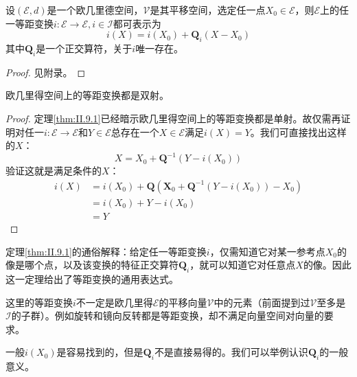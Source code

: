 \documentclass[main.tex]{subfiles}
\begin{document}
\begin{theorem}[等距变换的表示定理]\label{thm:II.9.1}
设$\left(\mathcal{E},d\right)$是一个欧几里德空间，$\mathcal{V}$是其平移空间，选定任一点$X_0\in\mathcal{E}$，则$\mathcal{E}$上的任一等距变换$i:\mathcal{E}\rightarrow\mathcal{E},i\in\mathcal{I}$都可表示为
\[
i\left(X\right)=i\left(X_0\right)+\mathbf{Q}_i\left(X-X_0\right)
\]
其中$\mathbf{Q}_i$是一个正交算符，关于$i$唯一存在。
\end{theorem}
\begin{proof}
见附录。
\end{proof}

\begin{corollary}
欧几里得空间上的等距变换都是双射。
\end{corollary}
\begin{proof}
定理\ref{thm:II.9.1}已经暗示欧几里得空间上的等距变换都是单射。故仅需再证明对任一$i:
\mathcal{E}\rightarrow\mathcal{E}$和$Y\in\mathcal{E}$总存在一个$X\in\mathcal{E}$满足$i\left(X\right)=Y$。我们可直接找出这样的$X$：
\[
X=X_0+\mathbf{Q}^{-1}\left(Y-i\left(X_0\right)\right)
\]
验证这就是满足条件的$X$：
\begin{align*}
i\left(X\right)&=i\left(X_0\right)+\mathbf{Q}\left(\mathbf{X}_0+\mathbf{Q}^{-1}\left(Y-i\left(X_0\right)\right)-X_0\right)\\
&=i\left(X_0\right)+Y-i\left(X_0\right)\\
&=Y
\end{align*}
\end{proof}

定理\ref{thm:II.9.1}的通俗解释：给定任一等距变换$i$，仅需知道它对某一参考点$X_0$的像是哪个点，以及该变换的特征正交算符$\mathbf{Q}_i$，就可以知道它对任意点$X$的像。因此这一定理给出了等距变换的通用表达式。

这里的等距变换$i$不一定是欧几里得$\mathcal{E}$的平移向量$\mathcal{V}$中的元素（前面提到过$\mathcal{V}$至多是$\mathcal{I}$的子群）。例如旋转和镜向反转都是等距变换，却不满足向量空间对向量的要求。

一般$i\left(X_0\right)$是容易找到的，但是$\mathbf{Q}_i$不是直接易得的。我们可以举例认识$\mathbf{Q}_i$的一般意义。
\end{document}
